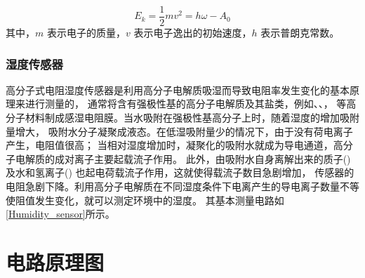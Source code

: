\documentclass[12pt,hyperref,a4paper,UTF8]{ctexart}
\begin{document}
\begin{equation}
    E_k = \frac{1}{2} mv^2 = h\omega - A_0
    \label{photoelectric}
\end{equation}
其中，$m$ 表示电子的质量，$v$ 表示电子逸出的初始速度，$h$ 表示普朗克常数。

\subsubsection{湿度传感器}
高分子式电阻湿度传感器是利用高分子电解质吸湿而导致电阻率发生变化的基本原理来进行测量的，
通常将含有强极性基的高分子电解质及其盐类，例如、、，
等高分子材料制成感湿电阻膜。当水吸附在强极性基高分子上时，随着湿度的增加吸附量增大，
吸附水分子凝聚成液态。在低湿吸附量少的情况下，由于没有荷电离子产生，电阻值很高；
当相对湿度增加时，凝聚化的吸附水就成为导电通道，高分子电解质的成对离子主要起载流子作用。
此外，由吸附水自身离解出来的质子()及水和氢离子() 也起电荷载流子作用，这就使得载流子数目急剧增加，
传感器的电阻急剧下降。利用高分子电解质在不同湿度条件下电离产生的导电离子数量不等使阻值发生变化，就可以测定环境中的湿度。
其基本测量电路如\autoref{Humidity_sensor}所示。


\section{电路原理图}
\end{document}
